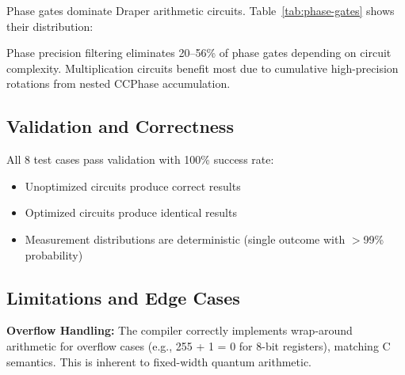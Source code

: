 \documentclass[a4paper,twocolumn]{article}
\begin{document}
Phase gates dominate Draper arithmetic circuits. Table~\ref{tab:phase-gates} shows their distribution:

\begin{table}[htbp]
  \centering
  \caption{Phase Gate Optimization}
  \label{tab:phase-gates}
\end{table}

Phase precision filtering eliminates 20--56\% of phase gates depending on circuit complexity.
Multiplication circuits benefit most due to cumulative high-precision rotations from nested CCPhase accumulation.

\subsection{Validation and Correctness}

All 8 test cases pass validation with 100\% success rate:
\begin{itemize}
  \item Unoptimized circuits produce correct results
  \item Optimized circuits produce identical results
  \item Measurement distributions are deterministic (single outcome with $>$99\% probability)
\end{itemize}


\subsection{Limitations and Edge Cases}

\textbf{Overflow Handling:} The compiler correctly implements wrap-around arithmetic for overflow
cases (e.g., 255 + 1 = 0 for 8-bit registers), matching C semantics. This is inherent to fixed-width
quantum arithmetic.
\end{document}
